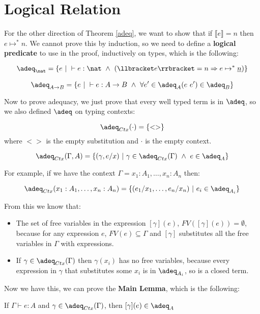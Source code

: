  \section{Logical Relation}

For the other direction of Theorem \ref{adeq}, we want to show that if $\llbracket e \rrbracket = n$ then $e \mapsto^* n$. We cannot prove this by induction, so we need to define a \textbf{logical predicate} to use in the proof, inductively on types, which is the following:

\[\adeq_{\nat} = \{e  \ | \ \vdash e : \nat \ \wedge \ (\llbracket e \rrbracket = n \Rightarrow e \mapsto^* \underline{n}) \} \]

\[\adeq_{A \to B} = \{ e \ | \  \vdash e : A \to B \ \wedge \ \forall e' \in \adeq_A (e \ e') \in \adeq_B \}\]

Now to prove adequacy, we just prove that every well typed term is in $\adeq$, so we also defined $\adeq$ on typing contexts:

\[\adeq_{Ctx} (\cdot) = \{ <>\} \]
where $<>$ is the empty substitution and $\cdot$ is the empty context.

\[\adeq_{Ctx}(\Gamma, A) = \{ (\gamma, e/x) \ | \ \gamma \in \adeq_{Ctx}(\Gamma) \ \wedge \ e \in \adeq_A\} \]

For example, if we have the context $\Gamma = x_1 : A_1, \dots , x_n : A_n$ then:

\[\adeq_{Ctx} (x_1 : A_1, \dots ,x_n : A_n) = \{(e_1 / x_1, \dots, e_n / x_n) \ | \ e_i \in \adeq_{A_i}\} \]

From this we know that:

\begin{itemize}
\item{The set of free variables in the expression $[\gamma](e)$, $FV([\gamma](e)) = \emptyset$, because for any expression $e$, $FV(e) \subseteq \Gamma$ and $[\gamma]$ substitutes all the free variables in $\Gamma$ with expressions.}
\item{If $\gamma \in \adeq_{Ctx}(\Gamma)$ then $\gamma(x_i)$ has no free variables, because every expression in $\gamma$ that substitutes some $x_i$ is in $\adeq_{A_i}$, so is a closed term.}
\end{itemize}


Now we have this, we can prove the \textbf{Main Lemma}, which is the following:

\vspace{0.5cm}

\begin{lem}
If $\Gamma \vdash e:A$ and $\gamma \in \adeq_{Ctx}(\Gamma)$, then $[\gamma](e) \in \adeq_A$
\end{lem}

